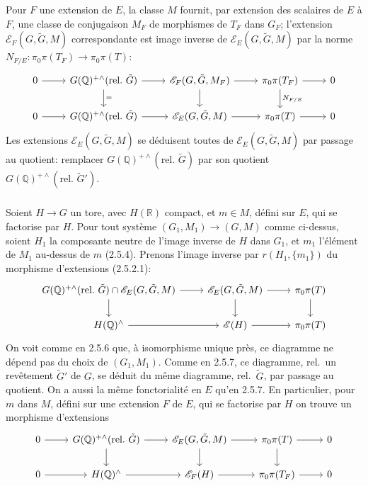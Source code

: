 \documentclass[12pt,a4paper]{article}
\theoremstyle{plain}
\theoremstyle{definition}
\theoremstyle{remark}
\newcommand{\QQ}{\mathbb{Q}}
\newcommand{\RR}{\mathbb{R}}
\begin{document}
Pour $F$ une extension de $E$, la classe $M$ fournit, par extension des scalaires de $E$ \`a $F$, une classe de conjugaison $M_F$ de morphismes de $T_F$ dans $G_F$; l'extension $\mathscr{E}_F(G,\tilde{G},M)$ correspondante est image inverse de $\mathscr{E}_E(G,\tilde{G},M)$ par la norme $N_{F/E}: \pi_0\pi(T_F) \to \pi_0\pi(T)$:
\[
\begin{tikzcd}
0 \arrow[r] & G(\QQ)^{+\wedge}(\text{rel.~}\tilde{G}) \arrow[r] \arrow[d, "="] & \mathscr{E}_F(G,\tilde{G},M_F) \arrow[r] \arrow[d] & \pi_0\pi(T_F) \arrow[r] \arrow[d, "N_{F/E}"] & 0 \\
0 \arrow[r] & G(\QQ)^{+\wedge}(\text{rel.~}\tilde{G}) \arrow[r] & \mathscr{E}_E(G,\tilde{G},M) \arrow[r] & \pi_0\pi(T) \arrow[r] & 0
\end{tikzcd}
\]
Les extensions $\mathscr{E}_E(G,\tilde{G},M)$ se d\'eduisent toutes de $\mathscr{E}_E(G,\tilde{G},M)$ par passage au quotient: remplacer $G(\QQ)^{+\wedge}(\text{rel.~}\tilde{G})$ par son quotient $G(\QQ)^{+\wedge}(\text{rel.~}\tilde{G}')$.

\subsubsection{}

Soient $H \to G$ un tore, avec $H(\RR)$ compact, et $m \in M$, d\'efini sur $E$, qui se factorise par $H$. Pour tout syst\`eme $(G_1,M_1) \to (G,M)$ comme ci-dessus, soient $H_1$ la composante neutre de l'image inverse de $H$ dans $G_1$, et $m_1$ l'\'el\'ement de $M_1$ au-dessus de $m$ (2.5.4). Prenons l'image inverse par $r(H_1,\{m_1\})$ du morphisme d'extensions (2.5.2.1):
\[
\begin{tikzcd}
G(\QQ)^{+\wedge}(\text{rel.~}\tilde{G}) \cap \mathscr{E}_E(G,\tilde{G},M) \arrow[r] \arrow[d] & \mathscr{E}_E(G,\tilde{G},M) \arrow[r] \arrow[d] & \pi_0\pi(T) \arrow[d] \\
H(\QQ)^{\wedge} \arrow[r] & \mathscr{E}(H) \arrow[r] & \pi_0\pi(T)
\end{tikzcd}
\]
On voit comme en 2.5.6 que, \`a isomorphisme unique pr\`es, ce diagramme ne d\'epend pas du choix de $(G_1,M_1)$. Comme en 2.5.7, ce diagramme, rel.~un rev\^etement $\tilde{G}'$ de $G$, se d\'eduit du m\^eme diagramme, rel.~$\tilde{G}$, par passage au quotient. On a aussi la m\^eme fonctorialit\'e en $E$ qu'en 2.5.7. En particulier, pour $m$ dans $M$, d\'efini sur une extension $F$ de $E$, qui se factorise par $H$ on trouve un morphisme d'extensions
\[
\begin{tikzcd}
0 \arrow[r] & G(\QQ)^{+\wedge}(\text{rel.~}\tilde{G}) \arrow[r] \arrow[d] & \mathscr{E}_E(G,\tilde{G},M) \arrow[r] \arrow[d] & \pi_0\pi(T) \arrow[r] \arrow[d] & 0 \\
0 \arrow[r] & H(\QQ)^{\wedge} \arrow[r] & \mathscr{E}_F(H) \arrow[r] & \pi_0\pi(T_F) \arrow[r] & 0
\end{tikzcd}
\]
\end{document}

